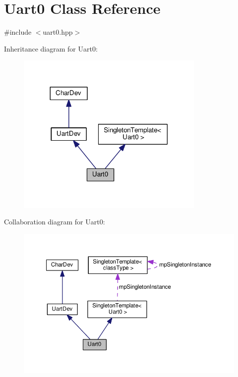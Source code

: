 \hypertarget{classUart0}{}\section{Uart0 Class Reference}
\label{classUart0}


{\ttfamily \#include $<$uart0.\+hpp$>$}



Inheritance diagram for Uart0\+:\nopagebreak
\begin{figure}[H]
\begin{center}
\leavevmode
\includegraphics[width=257pt]{d4/d6f/classUart0__inherit__graph}
\end{center}
\end{figure}


Collaboration diagram for Uart0\+:\nopagebreak
\begin{figure}[H]
\begin{center}
\leavevmode
\includegraphics[width=350pt]{d9/d24/classUart0__coll__graph}
\end{center}
\end{figure}
